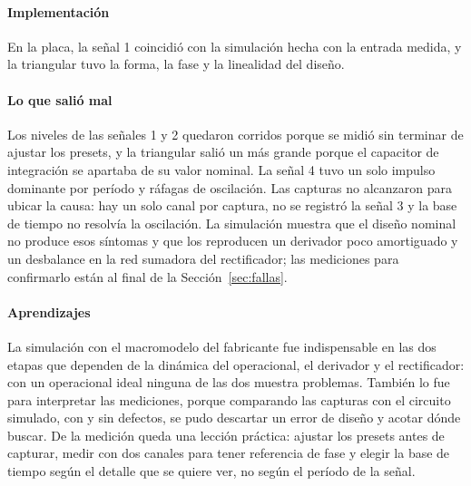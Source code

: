 \paragraph*{Implementación} En la placa, la señal 1 coincidió con la simulación hecha con la entrada medida, y la triangular tuvo la forma, la fase y la linealidad del diseño.

\paragraph*{Lo que salió mal} Los niveles de las señales 1 y 2 quedaron corridos porque se midió sin terminar de ajustar los presets, y la triangular salió un  más grande porque el capacitor de integración se apartaba de su valor nominal. La señal 4 tuvo un solo impulso dominante por período y ráfagas de oscilación. Las capturas no alcanzaron para ubicar la causa: hay un solo canal por captura, no se registró la señal 3 y la base de tiempo no resolvía la oscilación. La simulación muestra que el diseño nominal no produce esos síntomas y que los reproducen un derivador poco amortiguado y un desbalance en la red sumadora del rectificador; las mediciones para confirmarlo están al final de la Sección~\ref{sec:fallas}.

\paragraph*{Aprendizajes} La simulación con el macromodelo del fabricante fue indispensable en las dos etapas que dependen de la dinámica del operacional, el derivador y el rectificador: con un operacional ideal ninguna de las dos muestra problemas. También lo fue para interpretar las mediciones, porque comparando las capturas con el circuito simulado, con y sin defectos, se pudo descartar un error de diseño y acotar dónde buscar. De la medición queda una lección práctica: ajustar los presets antes de capturar, medir con dos canales para tener referencia de fase y elegir la base de tiempo según el detalle que se quiere ver, no según el período de la señal.
